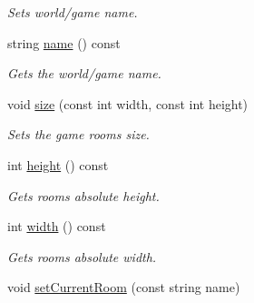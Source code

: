 \begin{DoxyCompactItemize}
\begin{DoxyCompactList}\small\item\em Sets world/game name. \item\end{DoxyCompactList}\item 
\hypertarget{classRoomsManager_afd9627aa92142f7ca8f35bf281e974cd}{
string \hyperlink{classRoomsManager_afd9627aa92142f7ca8f35bf281e974cd}{name} () const }
\label{classRoomsManager_afd9627aa92142f7ca8f35bf281e974cd}

\begin{DoxyCompactList}\small\item\em Gets the world/game name. \item\end{DoxyCompactList}\item 
\hypertarget{classRoomsManager_ac0c7e2dc24ee0b3c26b723a4558a0466}{
void \hyperlink{classRoomsManager_ac0c7e2dc24ee0b3c26b723a4558a0466}{size} (const int width, const int height)}
\label{classRoomsManager_ac0c7e2dc24ee0b3c26b723a4558a0466}

\begin{DoxyCompactList}\small\item\em Sets the game rooms size. \item\end{DoxyCompactList}\item 
\hypertarget{classRoomsManager_a50b9020cdb0bca96e666c5612f6c63cb}{
int \hyperlink{classRoomsManager_a50b9020cdb0bca96e666c5612f6c63cb}{height} () const }
\label{classRoomsManager_a50b9020cdb0bca96e666c5612f6c63cb}

\begin{DoxyCompactList}\small\item\em Gets rooms absolute height. \item\end{DoxyCompactList}\item 
\hypertarget{classRoomsManager_a900f1a06d3b4bd0e91dfe52376788e6a}{
int \hyperlink{classRoomsManager_a900f1a06d3b4bd0e91dfe52376788e6a}{width} () const }
\label{classRoomsManager_a900f1a06d3b4bd0e91dfe52376788e6a}

\begin{DoxyCompactList}\small\item\em Gets rooms absolute width. \item\end{DoxyCompactList}\item 
\hypertarget{classRoomsManager_aa363a81ebb172c5d5518e8f4685fcd5f}{
void \hyperlink{classRoomsManager_aa363a81ebb172c5d5518e8f4685fcd5f}{setCurrentRoom} (const string name)}
\label{classRoomsManager_aa363a81ebb172c5d5518e8f4685fcd5f}


\end{DoxyCompactItemize}

